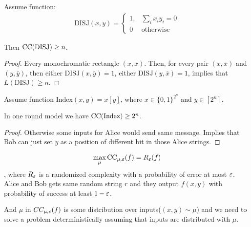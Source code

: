 \begin{thm}
	Assume function:
	\begin{align*}
		\text{DISJ}(x, y) = \begin{cases}
			1, & \sum\limits_i x_i y_i = 0 \\
			0 & \text{otherwise}
		\end{cases}
	\end{align*}
	
	Then $\operatorname{CC}(\text{DISJ}) \geq n$.
\end{thm}

\begin{proof}
	Every monochromatic rectangle $(x, \overline x)$. Then, for every pair $(x, \overline x)$ and $(y, \overline y)$, then either $\text{DISJ}(x, \overline y) = 1$, either $\text{DISJ}(y, \overline x) = 1$, implies that $L(\text{DISJ}) \geq n$.
\end{proof}

\begin{thm}
	Assume function $\text{Index}(x, y) = x[y]$, where $x \in \{0, 1\}^{2^n}$ and $y \in [2^n]$.
	
	In one round model we have $\operatorname{CC}(\text{Index}) \geq 2^n$.
\end{thm}

\begin{proof}
	Otherwise some inputs for Alice would send same message. Implies that Bob can just set $y$ as a position of different bit in those Alice strings.
\end{proof}

\begin{lm}
	\begin{align*}
		\max_\mu \operatorname{CC}_{\mu, \varepsilon}(f) = R_\varepsilon(f)
	\end{align*}, where $R_\varepsilon$ is a randomized complexity with a probability of error at most $\varepsilon$. Alice and Bob gets same random string $r$ and they output $f(x, y)$ with probability of success at least $1 - \varepsilon$.
	
	And $\mu$ in $CC_{\mu, \varepsilon}(f)$ is some distribution over inputs($(x, y) \sim \mu$) and we need to solve a problem deterministically assuming that inputs are distributed with $\mu$.
\end{lm}

